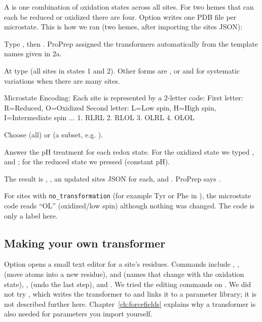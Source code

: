 A  is one combination of oxidation states across all sites.
For two hemes that can each be reduced or oxidized there are four. Option
 writes one PDB file per microstate. This is how we ran 
(two hemes, after importing the sites JSON):

\begin{steps}\sloppy
  \item Type , then . ProPrep assigned the transformers
        automatically from the template names given in 2a.
  \item At  type  (all sites
        in states 1 and 2). Other forms are , or
         and  for systematic variations when
        there are many sites.
\begin{screen}
Microstate Encoding:
  Each site is represented by a 2-letter code:
    First letter: R=Reduced, O=Oxidized
    Second letter: L=Low spin, H=High spin, I=Intermediate spin
...
  1. RLRL
  2. RLOL
  3. OLRL
  4. OLOL
\end{screen}
  \item Choose  (all) or  (a subset, e.g. ).
  \item Answer the pH treatment for each redox state. For the oxidized state
        we typed ,  and
        ; for the reduced state we pressed
         (constant pH).
\end{steps}

The result is , , an
updated sites JSON for each, and . ProPrep says
.

\begin{watchout}
For sites with \texttt{no\_transformation} (for example Tyr or Phe in
), the microstate code reads ``OL'' (oxidized/low spin) although
nothing was changed. The code is only a label here.
\end{watchout}

\subsection{Making your own transformer}

{\sloppy Option  opens a small text editor for a site's residues. Commands
include , ,  (move atoms
into a new residue),  and  (names that change with
the oxidation state), ,  (undo the last step),
 and . We tried the editing commands on .
We did not try , which writes the transformer to
 and links it to a parameter library; it is not
described further here. Chapter~\ref{ch:forcefields} explains why a
transformer is also needed for parameters you import yourself.\par}

